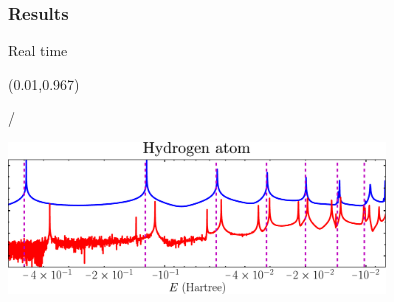 \documentclass{beamer}
\makeatletter
\newcommand{\framenumber}{
\begin{textblock}{0}(0.01,0.967)
\begin{scriptsize}
{\color{gray}\insertframenumber/\inserttotalframenumber}
\end{scriptsize}
\end{textblock}
}
\makeatother
\begin{document}
\subsubsection{Results}
\begin{frame}{Real time}\framenumber{}
\includegraphics[width=0.75\textwidth]{figures/h_spectrum}\\
\begin{flushright}
\end{flushright}
\end{frame}
\end{document}
